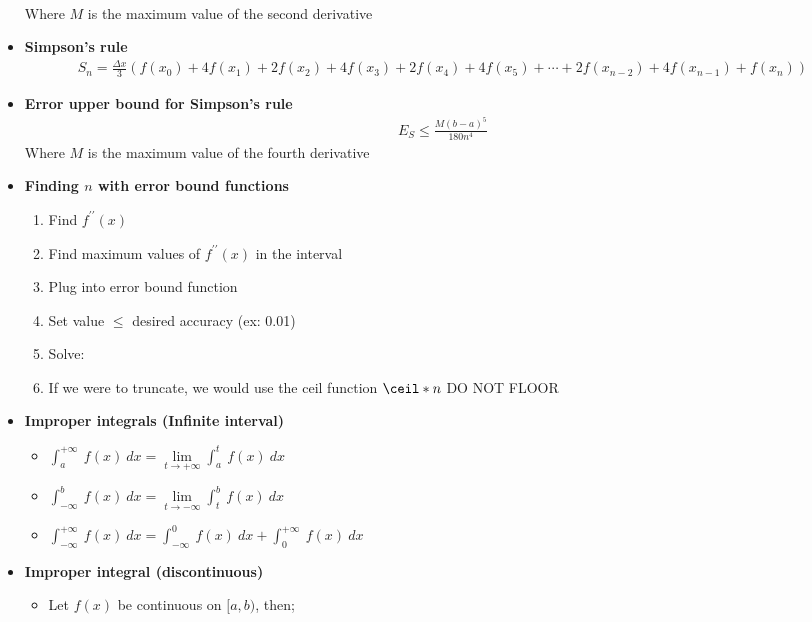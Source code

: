 \documentclass{report}
\begin{document}
\begin{itemize}
\begin{align*}
        \end{align*}
        Where $M$ is the maximum value of the second derivative
        \item \textbf{Simpson’s rule}
        \begin{align*}
            S_n = \frac{\Delta x}{3} \left( f(x_0) + 4f(x_1) + 2f(x_2) + 4f(x_3) + 2f(x_4) + 4f(x_5) + \cdots + 2f(x_{n-2}) + 4f(x_{n-1}) + f(x_n) \right)
        \end{align*}
        \item \textbf{Error upper bound for Simpson’s rule}
        \begin{align*}
            E_{S} \leq \frac{M(b-a)^5}{180n^4}
        \end{align*}
        Where $M$ is the maximum value of the fourth derivative
    \item \textbf{Finding $n$ with error bound functions}
        \begin{enumerate}
            \item Find $f^{\prime\prime}(x)$
            \item Find maximum values of $f^{\prime\prime}(x)$ in the interval
            \item Plug into error bound function 
            \item Set value $\leq$ desired accuracy (ex: 0.01)
            \item Solve: 
            \item If we were to truncate, we would use the ceil function $\ceil*{n}$ DO NOT FLOOR
        \end{enumerate}
    \item \textbf{Improper integrals (Infinite interval)}
        \begin{itemize}
            \item $\int_{a}^{+\infty}\ f(x)\ dx  = \lim\limits_{t \to +\infty}{\int_{a}^{t}\ f(x)\ dx}$  
            \item $\int_{-\infty}^{b}\ f(x)\ dx = \lim\limits_{t \to -\infty}{\int_{t}^{b}\ f(x)\ dx}$ 
            \item $\int_{-\infty}^{+\infty}\ f(x)\ dx = \int_{-\infty}^{0}\ f(x)\ dx + \int_{0}^{+\infty}\ f(x)\ dx$
        \end{itemize}
    \item \textbf{Improper integral (discontinuous)}
        \begin{itemize}
            \item Let $f(x)$ be continuous on $[a,b)$, then;
                \begin{align*}

\end{align*}
\end{itemize}
\end{itemize}
\end{document}
